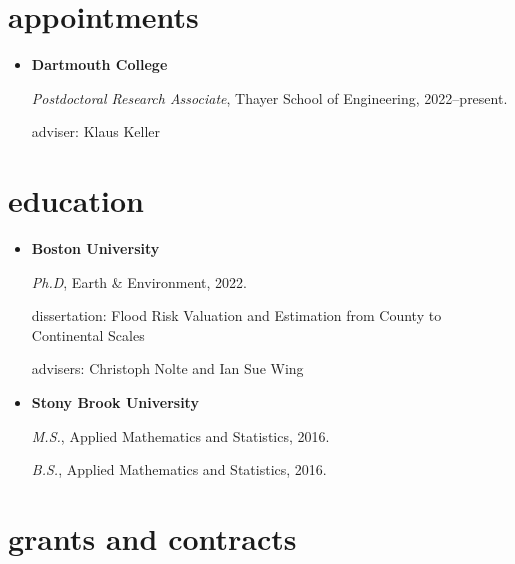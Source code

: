 \documentclass[10pt,oneside]{article}
\begin{document}

\section{appointments}

\mbox{}\vspace{-\dimexpr\baselineskip\relax}

\begin{itemize}[label={}]
  
  \item \textbf{Dartmouth College}
        
        \textit{Postdoctoral Research Associate}, Thayer School of Engineering, 2022--present.
        
        adviser: Klaus Keller
        
        
        
\end{itemize}


\section{education}

\mbox{}\vspace{-\dimexpr\baselineskip\relax}

\begin{itemize}[label={}]
  
  \item \textbf{Boston University}
        
        \textit{Ph.D}, Earth \& Environment, 2022.
        
        
        dissertation: Flood Risk Valuation and Estimation from County to Continental Scales
        
        advisers: Christoph Nolte and Ian Sue Wing
        
        
  \item \textbf{Stony Brook University}
        
        \textit{M.S.}, Applied Mathematics and Statistics, 2016.
        
        \textit{B.S.}, Applied Mathematics and Statistics, 2016.
        
        
        
\end{itemize}


\section{grants and contracts}
\end{document}
